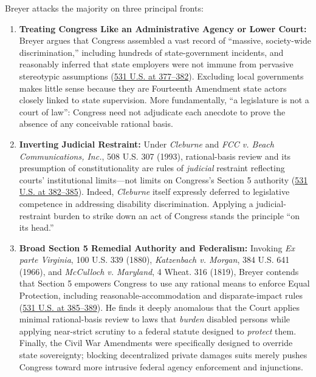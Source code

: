 \documentclass[12pt]{article}
\begin{document}
Breyer attacks the majority on three principal fronts:
\begin{enumerate}
\item \textbf{Treating Congress Like an Administrative Agency or Lower Court:} Breyer argues that Congress assembled a vast record of ``massive, society-wide discrimination,'' including hundreds of state-government incidents, and reasonably inferred that state employers were not immune from pervasive stereotypic assumptions (\href{https://supreme.justia.com/cases/federal/us/531/356/}{531 U.S. at 377--382}). Excluding local governments makes little sense because they are Fourteenth Amendment state actors closely linked to state supervision. More fundamentally, ``a legislature is not a court of law'': Congress need not adjudicate each anecdote to prove the absence of any conceivable rational basis.
\item \textbf{Inverting Judicial Restraint:} Under \textit{Cleburne} and \textit{FCC v. Beach Communications, Inc.}, 508 U.S. 307 (1993), rational-basis review and its presumption of constitutionality are rules of \textit{judicial} restraint reflecting courts' institutional limits---not limits on Congress's Section 5 authority (\href{https://supreme.justia.com/cases/federal/us/531/356/}{531 U.S. at 382--385}). Indeed, \textit{Cleburne} itself expressly deferred to legislative competence in addressing disability discrimination. Applying a judicial-restraint burden to strike down an act of Congress stands the principle ``on its head.''
\item \textbf{Broad Section 5 Remedial Authority and Federalism:} Invoking \textit{Ex parte Virginia}, 100 U.S. 339 (1880), \textit{Katzenbach v. Morgan}, 384 U.S. 641 (1966), and \textit{McCulloch v. Maryland}, 4 Wheat. 316 (1819), Breyer contends that Section 5 empowers Congress to use any rational means to enforce Equal Protection, including reasonable-accommodation and disparate-impact rules (\href{https://supreme.justia.com/cases/federal/us/531/356/}{531 U.S. at 385--389}). He finds it deeply anomalous that the Court applies minimal rational-basis review to laws that \textit{burden} disabled persons while applying near-strict scrutiny to a federal statute designed to \textit{protect} them. Finally, the Civil War Amendments were specifically designed to override state sovereignty; blocking decentralized private damages suits merely pushes Congress toward more intrusive federal agency enforcement and injunctions.
\end{enumerate}
\end{document}
